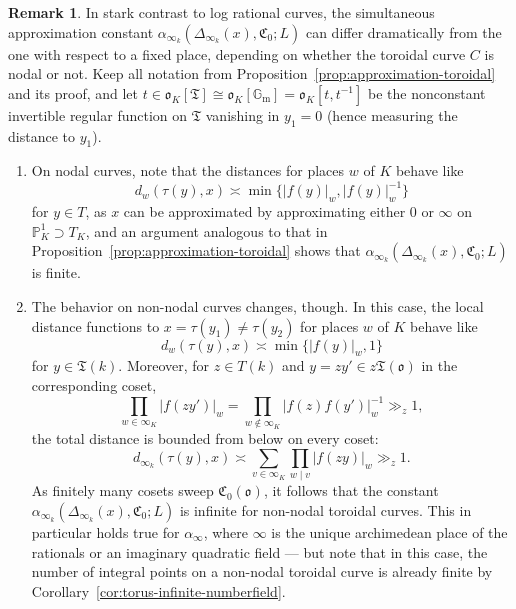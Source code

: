 \documentclass[a4paper, twoside, 11pt]{amsart}
\theoremstyle{definition}
\newtheorem{remark}[theorem]{Remark}
\newcommand{\mC}{\mathfrak{C}}
\newcommand{\mT}{\mathfrak{T}}
\newcommand{\fo}{\mathfrak{o}}
\newcommand{\PP}{\mathbb{P}}
\newcommand{\Gm}{\mathbb{G}_\mathrm{m}}
\begin{document}
    \begin{remark}
		In stark contrast to log rational curves, the simultaneous approximation constant $\alpha_{\infty_k}(\Delta_{\infty_k}(x),\mC_0;L)$ can differ dramatically from the one with respect to a fixed place, depending on whether the toroidal curve $C$ is nodal or not. Keep all notation from Proposition~\ref{prop:approximation-toroidal} and its proof, and let $t\in \fo_K[\mT]\cong \fo_K[\Gm]= \fo_K[t,t^{-1}]$ be the nonconstant invertible regular function on $\mT$ vanishing in $y_1=0$ (hence measuring the distance to $y_1$). 	 
        \begin{enumerate}
            \item On nodal curves, note that the distances for places $w$ of $K$ behave like
		\begin{equation*}
			d_w(\tau(y),x) \asymp \min\{|f(y)|_w, |f(y)|^{-1}_w\}
		\end{equation*} for $y\in T$,
		as $x$ can be approximated by approximating either $0$ or $\infty$ on $\PP_K^1\supset T_K$, and an argument analogous to that in Proposition~\ref{prop:approximation-toroidal} shows that $\alpha_{\infty_k}(\Delta_{\infty_k}(x),\mC_0;L)$ is finite. 
        \item The behavior on non-nodal curves changes, though.	 In this case, the local distance functions to $x=\tau(y_1)\ne \tau(y_2)$ for places $w$ of $K$ behave like
        \begin{equation*}
			d_w(\tau(y),x) \asymp \min\{|f(y)|_w, 1\}
		\end{equation*}
		for $y\in \mT(k)$. Moreover, for $z\in T(k)$ and $y=zy'\in z\mT(\fo)$ in the corresponding coset,
		\begin{equation*}
			\prod_{w\in \infty_K} |f(zy')|_w = \prod_{w\notin\infty_K} |f(z)f(y')|_w^{-1} \gg_z 1,
		\end{equation*}
		the total distance is bounded from below on every coset:
		\begin{equation*}
			d_{\infty_k}(\tau(y),x) \asymp \sum_{v\in \infty_K} \prod_{w\mid v} |f(zy)|_w \gg_z 1.
		\end{equation*}
		As finitely many cosets sweep $\mC_0(\fo)$, it follows that the constant $\alpha_{\infty_k}(\Delta_{\infty_k}(x),\mC_0;L)$ is infinite for non-nodal toroidal curves. This in particular holds true for $\alpha_\infty$, where $\infty$ is the unique archimedean place of the rationals or an imaginary quadratic field --- but note that in this case, the number of integral points on a non-nodal toroidal curve is already finite by Corollary~\ref{cor:torus-infinite-numberfield}.
        \end{enumerate}	
    \end{remark}
\end{document}
